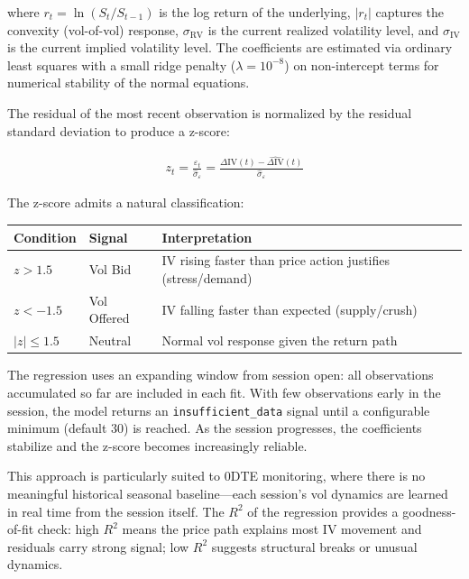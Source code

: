 \documentclass[11pt, a4paper]{article}
\begin{document}
where $r_t = \ln(S_t / S_{t-1})$ is the log return of the underlying, $|r_t|$ captures the convexity (vol-of-vol) response, $\sigma_{\text{RV}}$ is the current realized volatility level, and $\sigma_{\text{IV}}$ is the current implied volatility level. The coefficients are estimated via ordinary least squares with a small ridge penalty ($\lambda = 10^{-8}$) on non-intercept terms for numerical stability of the normal equations.

The residual of the most recent observation is normalized by the residual standard deviation to produce a z-score:

\begin{align}
z_t = \frac{\varepsilon_t}{\hat{\sigma}_\varepsilon} = \frac{\Delta\text{IV}(t) - \widehat{\Delta\text{IV}}(t)}{\hat{\sigma}_\varepsilon}
\end{align}

The z-score admits a natural classification:

\begin{center}
\begin{tabular}{l|l|l}
\textbf{Condition} & \textbf{Signal} & \textbf{Interpretation} \\
\hline
$z > 1.5$ & Vol Bid & IV rising faster than price action justifies (stress/demand) \\
$z < -1.5$ & Vol Offered & IV falling faster than expected (supply/crush) \\
$|z| \leq 1.5$ & Neutral & Normal vol response given the return path \\
\end{tabular}
\end{center}

The regression uses an expanding window from session open: all observations accumulated so far are included in each fit. With few observations early in the session, the model returns an \texttt{insufficient\_data} signal until a configurable minimum (default 30) is reached. As the session progresses, the coefficients stabilize and the z-score becomes increasingly reliable.

This approach is particularly suited to 0DTE monitoring, where there is no meaningful historical seasonal baseline---each session's vol dynamics are learned in real time from the session itself. The $R^2$ of the regression provides a goodness-of-fit check: high $R^2$ means the price path explains most IV movement and residuals carry strong signal; low $R^2$ suggests structural breaks or unusual dynamics.
\end{document}
